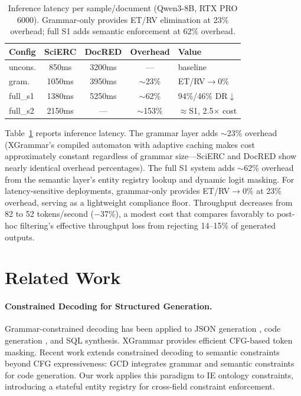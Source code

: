 \documentclass[11pt,a4paper]{article}
\begin{document}
\begin{table}[t]
\centering
\small
\begin{tabular}{lcccl}
\toprule
\textbf{Config} & \textbf{SciERC} & \textbf{DocRED} & \textbf{Overhead} & \textbf{Value} \\
\midrule
uncons. & 850ms & 3200ms & --- & baseline \\
gram. & 1050ms & 3950ms & $\sim$23\% & ET/RV$\to$0\% \\
full\_s1 & 1380ms & 5250ms & $\sim$62\% & 94\%/46\% DR$\downarrow$ \\
full\_s2 & 2150ms & --- & $\sim$153\% & $\approx$S1, 2.5$\times$ cost \\
\bottomrule
\end{tabular}
\caption{Inference latency per sample/document (Qwen3-8B, RTX PRO 6000). Grammar-only provides ET/RV elimination at 23\% overhead; full S1 adds semantic enforcement at 62\% overhead.}
\label{tab:latency}
\end{table}

Table~\ref{tab:latency} reports inference latency.
The grammar layer adds $\sim$23\% overhead (XGrammar's compiled automaton with adaptive caching makes cost approximately constant regardless of grammar size---SciERC and DocRED show nearly identical overhead percentages).
The full S1 system adds $\sim$62\% overhead from the semantic layer's entity registry lookup and dynamic logit masking.
For latency-sensitive deployments, grammar-only provides ET/RV$\to$0\% at 23\% overhead, serving as a lightweight compliance floor.
Throughput decreases from 82 to 52 tokens/second ($-$37\%), a modest cost that compares favorably to post-hoc filtering's effective throughput loss from rejecting 14--15\% of generated outputs.

\section{Related Work}

\paragraph{Constrained Decoding for Structured Generation.}
Grammar-constrained decoding has been applied to JSON generation \cite{willard2023efficient}, code generation \cite{scholak2021picard}, and SQL synthesis.
XGrammar \cite{dong2024xgrammar} provides efficient CFG-based token masking.
Recent work extends constrained decoding to semantic constraints beyond CFG expressiveness: GCD \cite{geng2024grammar} integrates grammar and semantic constraints for code generation.
Our work applies this paradigm to IE ontology constraints, introducing a stateful entity registry for cross-field constraint enforcement.
\end{document}

